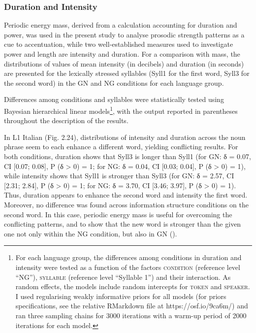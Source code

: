 \subsubsection{Duration and Intensity}
\hypertarget{Toc191305919}{}
Periodic energy mass, derived from a calculation accounting for duration and power, was used in the present study to analyse prosodic strength patterns as a cue to accentuation, while two well-established measures used to investigate power and length are intensity and duration. For a comparison with mass, the distributions of values of mean intensity (in decibels) and duration (in seconds) are presented for the lexically stressed syllables (Syll1 for the first word, Syll3 for the second word) in the GN and NG conditions for each language group.

Differences among conditions and syllables were statistically tested using Bayesian hierarchical linear models\footnote{For each language group, the differences among conditions in duration and intensity were tested as a function of the factors \textsc{condition} (reference level “NG”), \textsc{syllable} (reference level “Syllable 1”) and their interaction. As random effects, the models include random intercepts for \textsc{token} and \textsc{speaker}. I used regularising weakly informative priors \citep{Lemoine2019} for all models (for priors specifications, see the relative RMarkdown file at https://osf.io/9ca6m/) and ran three sampling chains for 3000 iterations with a warm-up period of 2000 iterations for each model.}, with the output reported in parentheses throughout the description of the results.

In L1 Italian (Fig. 2.24), distributions of intensity and duration across the noun phrase seem to each enhance a different word, yielding conflicting results. For both conditions, duration shows that Syll3 is longer than Syll1 (for GN: δ = 0.07, CI [0.07; 0.08], P (δ > 0) = 1; for NG: δ = 0.04, CI [0.03; 0.04], P (δ > 0) = 1), while intensity shows that Syll1 is stronger than Syll3 (for GN: δ = 2.57, CI [2.31; 2.84], P (δ > 0) = 1; for NG: δ = 3.70, CI [3.46; 3.97], P (δ > 0) = 1). Thus, duration appears to enhance the second word and intensity the first word. Moreover, no difference was found across information structure conditions on the second word. In this case, periodic energy mass is useful for overcoming the conflicting patterns, and to show that the new word is stronger than the given one not only within the NG condition, but also in GN ().

